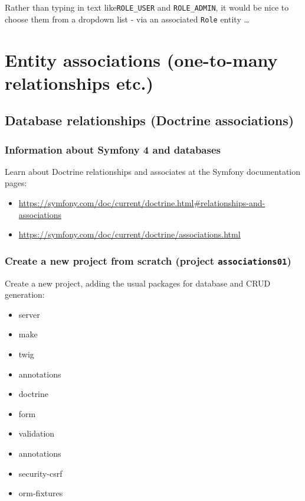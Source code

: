 \documentclass[a4paperpaper,openright]{book}
\providecommand{\tightlist}{%
  \setlength{\itemsep}{0pt}\setlength{\parskip}{0pt}}
\begin{document}
Rather than typing in text like\texttt{ROLE\_USER} and
\texttt{ROLE\_ADMIN}, it would be nice to choose them from a dropdown
list - via an associated \texttt{Role} entity \ldots{}

\part{Entity associations (one-to-many relationships etc.)}

\hypertarget{database-relationships-doctrine-associations}{%
\chapter{Database relationships (Doctrine
associations)}\label{database-relationships-doctrine-associations}}

\hypertarget{information-about-symfony-4-and-databases}{%
\section{Information about Symfony 4 and
databases}\label{information-about-symfony-4-and-databases}}

Learn about Doctrine relationships and associates at the Symfony
documentation pages:

\begin{itemize}
\item
  \url{https://symfony.com/doc/current/doctrine.html\#relationships-and-associations}
\item
  \url{https://symfony.com/doc/current/doctrine/associations.html}
\end{itemize}

\hypertarget{create-a-new-project-from-scratch-project-associations01}{%
\section{\texorpdfstring{Create a new project from scratch (project
\texttt{associations01})}{Create a new project from scratch (project associations01)}}\label{create-a-new-project-from-scratch-project-associations01}}

Create a new project, adding the usual packages for database and CRUD
generation:

\begin{itemize}
\tightlist
\item
  server
\item
  make
\item
  twig
\item
  annotations
\item
  doctrine
\item
  form
\item
  validation
\item
  annotations
\item
  security-csrf
\item
  orm-fixtures
\end{itemize}
\end{document}
